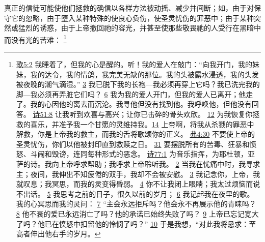 \documentclass[12pt, a4paper, oneside]{ctexart}
\newcounter{parnum}[section]
\newcommand{\N}{%
   \noindent\refstepcounter{parnum}%
    \makebox[\parindent][l]{\textbf{\arabic{parnum}.}}}
\begin{document}
\N 真正的信徒可能使他们拯救的确信以各样方法被动摇、减少并间断；如，由于对保守它的忽略，由于堕入某种特殊的使良心负伤，使圣灵忧伤的罪恶中；由于某种突然或猛烈的诱惑，由于上帝撤回祂的容光，并甚至使那些敬畏祂的人受行在黑暗中而没有光的苦难：
	\footnote {
		\href{https://biblehub.com/songs/5-2.htm}{歌5:2} 我睡着了，但我的心是醒的。听！我的爱人在敲门：“向我开门，我的妹妹，我的达令，我的情鸽，我完美无缺的那位。我的头被露水浸透，我的头发被夜晚的潮气滴湿。”
		\href{https://biblehub.com/songs/5-3.htm}{3} 我已脱下我的长袍---我必须再穿上它吗？我已洗完我的脚---我必须再弄脏它们吗？
		\href{https://biblehub.com/songs/5-6.htm}{6} 我为我的爱人开门，但我的爱人已离开；他走了。我的心因他的离去而沉沦。我寻他但没有找到他。我呼唤他，但他没有回答。
		\href{https://biblehub.com/psalms/51-8.htm}{诗51:8} 让我听到欢喜与高兴；让你已击碎的骨头欢欣。
		\href{https://biblehub.com/psalms/51-12.htm}{12} 为我恢复你拯救的喜乐，并准予我一个甘愿的灵维持我。\href{https://biblehub.com/psalms/51-14.htm}{14} 上帝啊，将我从杀戮的罪恶中解救，你是上帝我的救主，而我的舌将歌颂你的正义。
		\href{https://biblehub.com/ephesians/4-30.htm}{弗4:30} 不要使上帝的圣灵忧伤，你们以他被封印直到救赎之日。
		\href{https://biblehub.com/ephesians/4-31.htm}{31} 要摆脱所有的苦毒、狂暴和愤怒、斗闹和毁谤，连同每种形式的恶念。
		\href{https://biblehub.com/psalms/77-1.htm}{诗77:1} 为音乐指挥，为耶杜顿，亚萨的诗。我向上帝呼求帮助；我呼求上帝聆听我。
		\href{https://biblehub.com/psalms/77-2.htm}{2} 当我在忧痛中时，我寻求主；夜间，我伸出不知疲倦的双手，我却不会被安慰。
		\href{https://biblehub.com/psalms/77-3.htm}{3} 我记念你，上帝，我就叹息；我冥思，而我的灵变得昏弱。
		\href{https://biblehub.com/psalms/77-4.htm}{4} 你不让我闭上眼睛；我太过烦恼而说不出话。
		\href{https://biblehub.com/psalms/77-5.htm}{5} 我思考之前的日子，很久以前的岁月；
		\href{https://biblehub.com/psalms/77-6.htm}{6} 我记起我在夜里的歌。我的心冥思而我的灵问：
		\href{https://biblehub.com/psalms/77-7.htm}{7} “主会永远拒斥吗？他会永不再展示他的青睐吗？
		\href{https://biblehub.com/psalms/77-8.htm}{8} 他不衰的爱已永远消亡了吗？他的承诺已始终失败了吗？
		\href{https://biblehub.com/psalms/77-9.htm}{9} 上帝已忘记宽大了吗？他已在愤怒中扣留他的怜悯了吗？”
		\href{https://biblehub.com/psalms/77-10.htm}{10} 于是我想，“对此我将恳求：至高者伸出他右手的岁月。
}
\end{document}
